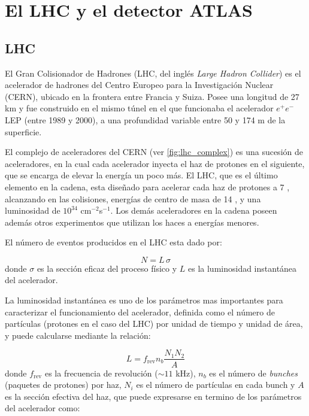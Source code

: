 \chapter{El LHC y el detector ATLAS}
\label{cap:detector}


\section{LHC}

El Gran Colisionador de Hadrones (LHC, del inglés \emph{Large Hadron Collider})
\cite{Evans:1129806} es el acelerador de hadrones del Centro Europeo para la
Investigación Nuclear (CERN), ubicado en la frontera entre Francia y Suiza.
Posee una longitud de 27 km y fue construido en el mismo túnel en el que
funcionaba el acelerador $e^{+}e^{-}$ LEP \cite{LEP} (entre 1989 y 2000), a una
profundidad variable entre 50 y 174 m de la superficie.

El complejo de aceleradores del CERN (ver \cref{fig:lhc_complex}) es una
sucesión de aceleradores, en la cual cada acelerador inyecta el haz de protones
en el siguiente, que se encarga de elevar la energía un poco más. El LHC, que es
el último elemento en la cadena, esta diseñado para acelerar cada haz de
protones a 7 \tev, alcanzando en las colisiones, energías de centro de masa de
14 \tev, y una luminosidad de $10^{34}$ cm$^{-2}$s$^{-1}$. Los demás
aceleradores en la cadena poseen además otros experimentos que utilizan los
haces a energías menores.

El número de eventos producidos en el LHC esta dado
por:

\begin{equation}
  N = L \, \sigma
\end{equation}
%
donde $\sigma$ es la sección eficaz del proceso físico y $L$ es la luminosidad instantánea del
acelerador.


La luminosidad instantánea es uno de los parámetros mas importantes para
caracterizar el funcionamiento del acelerador, definida como el número de
partículas (protones en el caso del LHC) por unidad de tiempo y unidad de
área, y puede calcularse mediante la relación:

\begin{equation}
  L = f_\text{rev} n_b \frac{N_1 N_2}{A}
\end{equation}
%
donde $f_\text{rev}$ es la frecuencia de revolución ($\sim 11$ kHz), $n_b$ es el número de
\emph{bunches} (paquetes de protones) por haz, $N_i$ es el número de partículas
en cada bunch y $A$ es la sección efectiva del haz, que puede expresarse en
termino de los parámetros del acelerador como:

